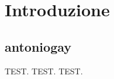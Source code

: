 \chapter{Introduzione}
\label{chap:introduction}
\section{antoniogay}
\label{sect:gay}
TEST.
TEST.
TEST.
